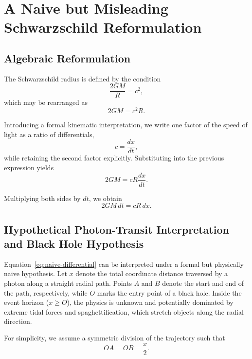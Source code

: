 \documentclass[12pt,a4paper]{article}
\begin{document}
\section{A Naive but Misleading Schwarzschild Reformulation}

\subsection{Algebraic Reformulation}

The Schwarzschild radius is defined by the condition
\begin{equation}
\frac{2GM}{R} = c^2,
\end{equation}
which may be rearranged as
\begin{equation}
2GM = c^2 R.
\end{equation}

Introducing a formal kinematic interpretation, we write one factor of the speed of light as a ratio of differentials,
\begin{equation}
c = \frac{dx}{dt},
\end{equation}
while retaining the second factor explicitly. Substituting into the previous expression yields
\begin{equation}
2GM = c R \frac{dx}{dt}.
\end{equation}

Multiplying both sides by $dt$, we obtain
\begin{equation}
2GM\, dt = c R\, dx.
\label{eq:naive-differential}
\end{equation}

\subsection{Hypothetical Photon-Transit Interpretation and Black Hole Hypothesis}

Equation~\eqref{eq:naive-differential} can be interpreted under a formal but physically naive hypothesis. 
Let $x$ denote the total coordinate distance traversed by a photon along a straight radial path. 
Points $A$ and $B$ denote the start and end of the path, respectively, while $O$ marks the entry point of a black hole. 
Inside the event horizon ($x \ge O$), the physics is unknown and potentially dominated by extreme tidal forces and spaghettification, which stretch objects along the radial direction.

For simplicity, we assume a symmetric division of the trajectory such that
\[ OA = OB = \frac{x}{2}. \]
\end{document}
